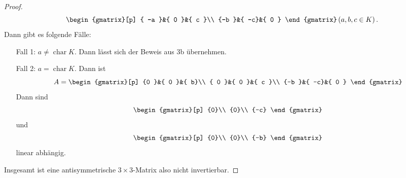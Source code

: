 \documentclass{article}
\begin{document}
\begin{enumerate}[(a)]
\begin{proof}
$$\begin{gmatrix}[p]
				{ -a }&{ 0 }&{ c }\\
				{-b }&{ -c}&{ 0 }
			\end{gmatrix}
			\left( a,b,c \in K\right).$$ Dann gibt es folgende Fälle:
			\begin{itemize}
				\item[Fall 1:] $a \neq \operatorname{char} K$. Dann lässt sich der Beweis aus 3b übernehmen.
				\item[Fall 2:] $a = \operatorname{char} K$. Dann ist 
				$$ A = \begin{gmatrix}[p]
					{0  }&{ 0 }&{ b}\\
					{ 0 }&{ 0 }&{ c }\\
					{-b }&{ -c}&{ 0 }
				\end{gmatrix} $$
				Dann sind $$\begin{gmatrix}[p]
					{0}\\
					{0}\\
					{-c}
				\end{gmatrix}$$ und $$\begin{gmatrix}[p]
					{0}\\
					{0}\\
					{-b}
				\end{gmatrix}$$ linear abhängig.
			\end{itemize}
			Insgesamt ist eine antisymmetrische $3 \times 3$-Matrix also nicht invertierbar.
	      \end{proof}
\end{enumerate}
\end{document}
